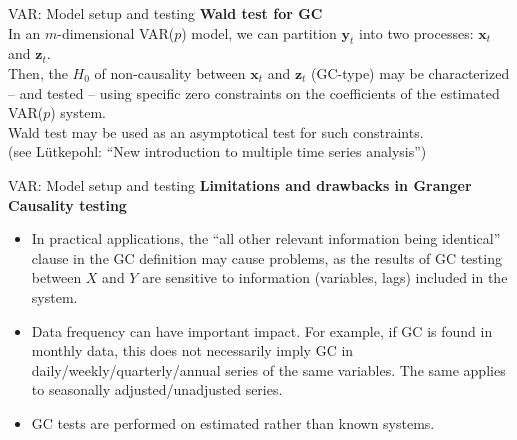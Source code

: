 \documentclass[usenames,dvipsnames]{beamer}
\begin{document}
\begin{frame}{VAR: Model setup and testing}
\textbf{Wald test for GC}\\
\vspace*{3mm}
In an $m$-dimensional VAR($p$) model, we can partition $\bm{y}_t$ into two processes: $\bm{x}_t$ and $\bm{z}_t$. \\ 
\vspace*{1.9mm}
Then, the $H_0$ of non-causality between $\bm{x}_t$ and $\bm{z}_t$  (GC-type) may be characterized – and tested – using specific zero constraints on the coefficients of the estimated VAR($p$) system. \\
\vspace*{1.9mm}
Wald test may be used as an asymptotical test for such constraints. \\
\vspace{0.5cm}
\small (see Lütkepohl: ``New introduction to multiple time series analysis'')\\
\end{frame}
\begin{frame}{VAR: Model setup and testing}
\textbf{Limitations and drawbacks in Granger Causality testing}\\
\vspace*{3mm}
\begin{itemize}
\item In practical applications, the ``all other relevant information being identical'' clause in the GC definition may cause problems, as the results of GC testing between $X$ and $Y$ are sensitive to information (variables, lags) included in the system.
\vspace*{1.9mm}
\item Data frequency can have important impact. For example, if GC is found in monthly data, this does not necessarily imply GC in daily/weekly/quarterly/annual series of the same variables. The same applies to seasonally adjusted/unadjusted series.
\vspace*{1.9mm}
\item GC tests are performed on estimated rather than known systems.
\end{itemize}
\end{frame}
\end{document}

